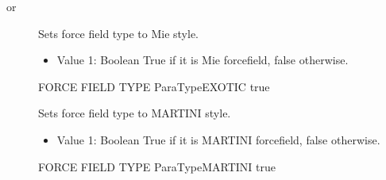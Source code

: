 \documentclass[letterpaper,10pt,english]{sphinxmanual}
\begin{document}
\begin{description}
\item[{ or }] \leavevmode
\sphinxAtStartPar
Sets force field type to Mie style.
\begin{itemize}
\item {} 
\sphinxAtStartPar
Value 1: Boolean \sphinxhyphen{} True if it is Mie forcefield, false otherwise.

\end{itemize}

\begin{sphinxVerbatim}[commandchars=\\\{\}]
\PYGZsh{}\PYGZsh{}\PYGZsh{}\PYGZsh{}\PYGZsh{}\PYGZsh{}\PYGZsh{}\PYGZsh{}\PYGZsh{}\PYGZsh{}\PYGZsh{}\PYGZsh{}\PYGZsh{}\PYGZsh{}\PYGZsh{}\PYGZsh{}\PYGZsh{}\PYGZsh{}\PYGZsh{}\PYGZsh{}\PYGZsh{}\PYGZsh{}\PYGZsh{}\PYGZsh{}\PYGZsh{}\PYGZsh{}\PYGZsh{}\PYGZsh{}\PYGZsh{}\PYGZsh{}\PYGZsh{}\PYGZsh{}\PYGZsh{}
\PYGZsh{} FORCE FIELD TYPE
\PYGZsh{}\PYGZsh{}\PYGZsh{}\PYGZsh{}\PYGZsh{}\PYGZsh{}\PYGZsh{}\PYGZsh{}\PYGZsh{}\PYGZsh{}\PYGZsh{}\PYGZsh{}\PYGZsh{}\PYGZsh{}\PYGZsh{}\PYGZsh{}\PYGZsh{}\PYGZsh{}\PYGZsh{}\PYGZsh{}\PYGZsh{}\PYGZsh{}\PYGZsh{}\PYGZsh{}\PYGZsh{}\PYGZsh{}\PYGZsh{}\PYGZsh{}\PYGZsh{}\PYGZsh{}\PYGZsh{}\PYGZsh{}\PYGZsh{}
ParaTypeEXOTIC    true
\end{sphinxVerbatim}

\item[{}] \leavevmode
\sphinxAtStartPar
Sets force field type to MARTINI style.
\begin{itemize}
\item {} 
\sphinxAtStartPar
Value 1: Boolean \sphinxhyphen{} True if it is MARTINI forcefield, false otherwise.

\end{itemize}

\begin{sphinxVerbatim}[commandchars=\\\{\}]
\PYGZsh{}\PYGZsh{}\PYGZsh{}\PYGZsh{}\PYGZsh{}\PYGZsh{}\PYGZsh{}\PYGZsh{}\PYGZsh{}\PYGZsh{}\PYGZsh{}\PYGZsh{}\PYGZsh{}\PYGZsh{}\PYGZsh{}\PYGZsh{}\PYGZsh{}\PYGZsh{}\PYGZsh{}\PYGZsh{}\PYGZsh{}\PYGZsh{}\PYGZsh{}\PYGZsh{}\PYGZsh{}\PYGZsh{}\PYGZsh{}\PYGZsh{}\PYGZsh{}\PYGZsh{}\PYGZsh{}\PYGZsh{}\PYGZsh{}
\PYGZsh{} FORCE FIELD TYPE
\PYGZsh{}\PYGZsh{}\PYGZsh{}\PYGZsh{}\PYGZsh{}\PYGZsh{}\PYGZsh{}\PYGZsh{}\PYGZsh{}\PYGZsh{}\PYGZsh{}\PYGZsh{}\PYGZsh{}\PYGZsh{}\PYGZsh{}\PYGZsh{}\PYGZsh{}\PYGZsh{}\PYGZsh{}\PYGZsh{}\PYGZsh{}\PYGZsh{}\PYGZsh{}\PYGZsh{}\PYGZsh{}\PYGZsh{}\PYGZsh{}\PYGZsh{}\PYGZsh{}\PYGZsh{}\PYGZsh{}\PYGZsh{}\PYGZsh{}
ParaTypeMARTINI     true
\end{sphinxVerbatim}


\end{description}
\end{document}
